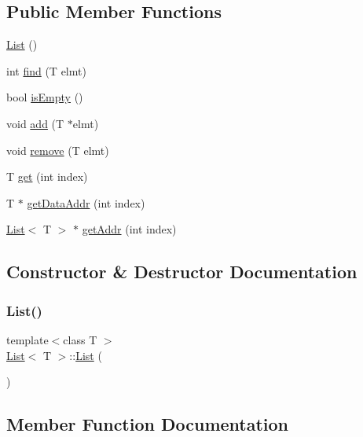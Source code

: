 \subsection*{Public Member Functions}
\begin{DoxyCompactItemize}
\item 
\mbox{\hyperlink{class_list_a5c5e27671b21b3815d4e25b953c69454}{List}} ()
\item 
int \mbox{\hyperlink{class_list_afcc0ad2940d9efbd8b487bc40e3f0067}{find}} (T elmt)
\item 
bool \mbox{\hyperlink{class_list_a73f8b1d313382daffeeeed552f42da2f}{is\+Empty}} ()
\item 
void \mbox{\hyperlink{class_list_aea51297cc29bc89acf013d43636a6a19}{add}} (T $\ast$elmt)
\item 
void \mbox{\hyperlink{class_list_a7fac84accc112425caecf55c6b92911d}{remove}} (T elmt)
\item 
T \mbox{\hyperlink{class_list_a8674ced74b669f6c49292a4545c5b1e3}{get}} (int index)
\item 
T $\ast$ \mbox{\hyperlink{class_list_a09652510ae90b0f23ecfbc64fe81edc9}{get\+Data\+Addr}} (int index)
\item 
\mbox{\hyperlink{class_list}{List}}$<$ T $>$ $\ast$ \mbox{\hyperlink{class_list_ad34f9546e1bee20ecf23a985e34c3fb8}{get\+Addr}} (int index)
\end{DoxyCompactItemize}


\subsection{Constructor \& Destructor Documentation}
\mbox{\label{class_list_a5c5e27671b21b3815d4e25b953c69454}} 
\subsubsection{\texorpdfstring{List()}{List()}}
{\footnotesize\ttfamily template$<$class T $>$ \\
\mbox{\hyperlink{class_list}{List}}$<$ T $>$\+::\mbox{\hyperlink{class_list}{List}} (\begin{DoxyParamCaption}{ }\end{DoxyParamCaption})}



\subsection{Member Function Documentation}
\mbox{\label{class_list_aea51297cc29bc89acf013d43636a6a19}} 
